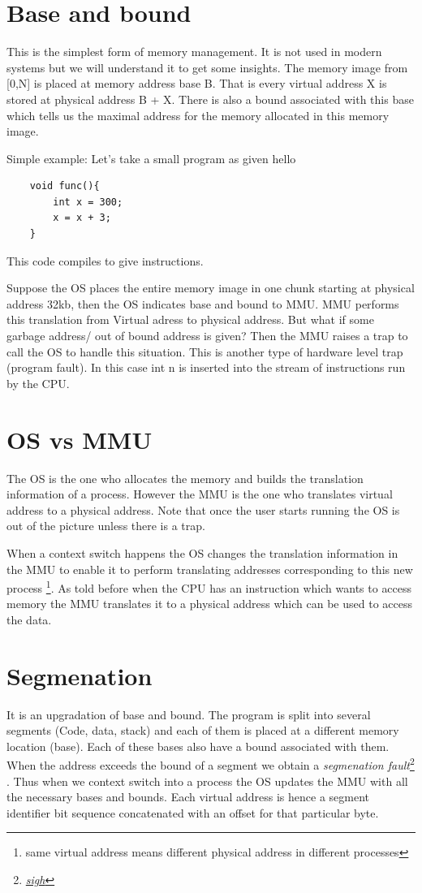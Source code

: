 \documentclass[12pt]{article}
\begin{document}
\section{Base and bound}
This is the simplest form of memory management. It is not used in modern systems but we will understand it to get some insights. The memory image
from [0,N] is placed at memory address base B. That is every virtual address X is stored at physical address B + X. There is also a bound associated with this base which tells us 
the maximal address for the memory allocated in this memory image.



Simple example: Let's take a small program as given hello

\begin{lstlisting}
    void func(){
        int x = 300;
        x = x + 3;
    }
\end{lstlisting}
This code compiles to give instructions. 

Suppose the OS places the entire memory image in one chunk starting at physical address 32kb, then the OS indicates base and bound to MMU. 
MMU performs this translation from Virtual adress to physical address. But what if some garbage address/ out of bound address is given? Then the
MMU raises a trap to call the OS to handle this situation. This is another type of hardware level trap (program fault). In this case int n is inserted into the 
stream of instructions run by the CPU. 

\section{OS vs MMU}
The OS is the one who allocates the memory and builds the translation information of a process. However the MMU
is the one who translates virtual address to a physical address. Note that once the user starts running the OS is out of the picture unless there is a trap.

When a context switch happens the OS changes the translation information in the MMU to enable it to perform translating addresses corresponding to this new process \footnote{same virtual address means different physical address in different processes}. 
As told before when the CPU has an instruction which wants to access memory the MMU translates it to a physical address which can be used to access the data.

\section{Segmenation}
It is an upgradation of base and bound. The program is split into several segments (Code, data, stack) and each of them is placed at a different memory location (base).
Each of these bases also have a bound associated with them. When the address exceeds the bound of a segment we obtain a \textit{segmenation fault}\footnote{\href{https://www.youtube.com/watch?v=NAEppFUWLfc}{\textit{sigh}}}
. Thus when we context switch into a process the OS updates the MMU with all the necessary bases and bounds.
Each virtual address is hence a segment identifier bit sequence concatenated with an offset for that particular byte.
\end{document}
